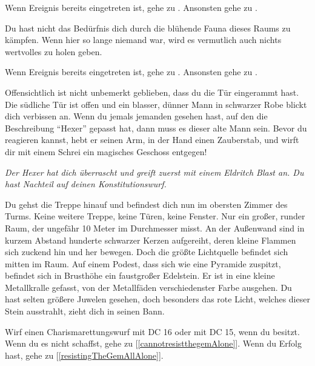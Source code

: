 Wenn Ereignis  bereits eingetreten ist, gehe zu .
Ansonsten gehe zu .


Du hast nicht das Bedürfnis dich durch die blühende Fauna dieses Raums zu kämpfen. Wenn hier so lange niemand war, wird es vermutlich auch nichts wertvolles zu holen geben.

Wenn Ereignis  bereits eingetreten ist, gehe zu .
Ansonsten gehe zu .


Offensichtlich ist nicht unbemerkt geblieben, dass du die Tür eingerammt hast. Die südliche Tür ist offen und ein blasser, dünner Mann in schwarzer Robe blickt dich verbissen an. Wenn du jemals jemanden gesehen hast, auf den die Beschreibung ``Hexer'' gepasst hat, dann muss es dieser alte Mann sein. Bevor du reagieren kannst, hebt er seinen Arm, in der Hand einen Zauberstab, und wirft dir mit einem Schrei ein magisches Geschoss entgegen!

\textit{Der Hexer hat dich überrascht und greift zuerst mit einem Eldritch Blast an. Du hast Nachteil auf deinen Konstitutionswurf.}



Du gehst die Treppe hinauf und befindest dich nun im obersten Zimmer des Turms. Keine weitere Treppe, keine Türen, keine Fenster. Nur ein großer, runder Raum, der ungefähr 10 Meter im Durchmesser misst. An der Außenwand sind in kurzem Abstand hunderte schwarzer Kerzen aufgereiht, deren kleine Flammen sich zuckend hin und her bewegen.
Doch die größte Lichtquelle befindet sich mitten im Raum. Auf einem Podest, dass sich wie eine Pyramide zuspitzt, befindet sich in Brusthöhe ein faustgroßer Edelstein. Er ist in eine kleine Metallkralle gefasst, von der Metallfäden verschiedenster Farbe ausgehen. Du hast selten größere Juwelen gesehen, doch besonders das rote Licht, welches dieser Stein ausstrahlt, zieht dich in seinen Bann.

Wirf einen Charismarettungswurf mit DC 16 oder mit DC 15, wenn du  besitzt. Wenn du es nicht schaffst, gehe zu [\ref{cannotresistthegemAlone}]. Wenn du Erfolg hast, gehe zu [\ref{resistingTheGemAllAlone}].

